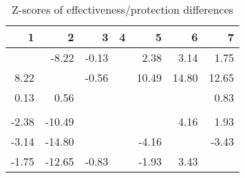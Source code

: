 \begin{table}[ht]
\centering
\begin{tabular}{rrrrrrr}
  \hline
1 & 2 & 3 & 4 & 5 & 6 & 7 \\ 
  \hline
 & -8.22 & -0.13 &  & 2.38 & 3.14 & 1.75 \\ 
  8.22 &  & -0.56 &  & 10.49 & 14.80 & 12.65 \\ 
  0.13 & 0.56 &  &  &  &  & 0.83 \\ 
   &  &  &  &  &  &  \\ 
  -2.38 & -10.49 &  &  &  & 4.16 & 1.93 \\ 
  -3.14 & -14.80 &  &  & -4.16 &  & -3.43 \\ 
  -1.75 & -12.65 & -0.83 &  & -1.93 & 3.43 &  \\ 
   \hline
\end{tabular}
\caption{Z-scores of effectiveness/protection differences} 
\end{table}
